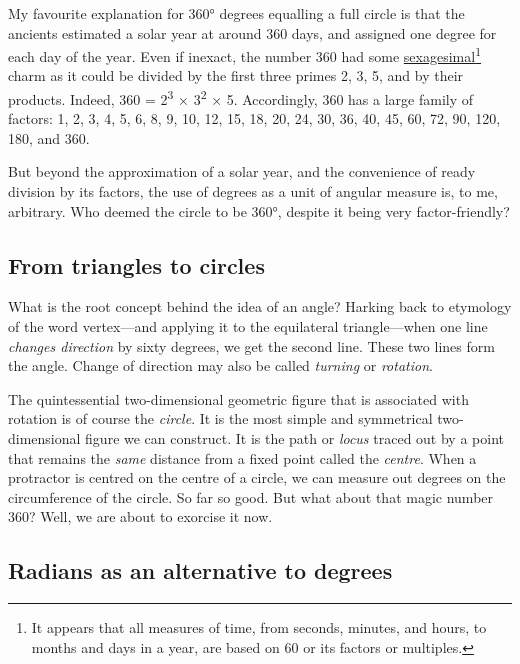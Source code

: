 \documentclass[
  a4paper,
]{article}
\begin{document}
My favourite explanation for 360° degrees equalling a full circle is
that the ancients estimated a solar year at around 360 days, and
assigned one degree for each day of the year. Even if inexact, the
number 360 had some
\href{https://en.wikipedia.org/wiki/Sexagesimal}{sexagesimal}\footnote{It
  appears that all measures of time, from seconds, minutes, and hours,
  to months and days in a year, are based on 60 or its factors or
  multiples.} charm as it could be divided by the first three primes 2,
3, 5, and by their products. Indeed, 360 = 2\textsuperscript{3} ×
3\textsuperscript{2} × 5. Accordingly, 360 has a large family of
factors: 1, 2, 3, 4, 5, 6, 8, 9, 10, 12, 15, 18, 20, 24, 30, 36, 40, 45,
60, 72, 90, 120, 180, and 360.

But beyond the approximation of a solar year, and the convenience of
ready division by its factors, the use of degrees as a unit of angular
measure is, to me, arbitrary. Who deemed the circle to be 360°, despite
it being very factor-friendly?

\hypertarget{from-triangles-to-circles}{%
\subsection{From triangles to circles}\label{from-triangles-to-circles}}

What is the root concept behind the idea of an angle? Harking back to
etymology of the word vertex---and applying it to the equilateral
triangle---when one line \emph{changes direction} by sixty degrees, we
get the second line. These two lines form the angle. Change of direction
may also be called \emph{turning} or \emph{rotation}.

The quintessential two-dimensional geometric figure that is associated
with rotation is of course the \emph{circle}. It is the most simple and
symmetrical two-dimensional figure we can construct. It is the path or
\emph{locus} traced out by a point that remains the \emph{same} distance
from a fixed point called the \emph{centre}. When a protractor is
centred on the centre of a circle, we can measure out degrees on the
circumference of the circle. So far so good. But what about that magic
number 360? Well, we are about to exorcise it now. 
\normalfont

\hypertarget{radians-as-an-alternative-to-degrees}{%
\subsection{Radians as an alternative to
degrees}\label{radians-as-an-alternative-to-degrees}}
\end{document}
